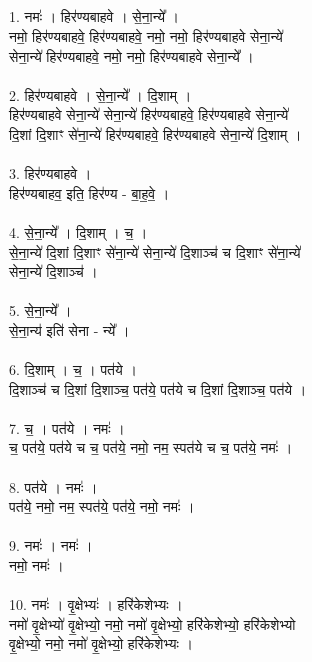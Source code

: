 \subsection{}
1. नमः॑ । हिर॑ण्यबाहवे । से॒ना॒न्ये᳚ ।\\
नमो॒ हिर॑ण्यबाहवे॒ हिर॑ण्यबाहवे॒ नमो॒ नमो॒ हिर॑ण्यबाहवे सेना॒न्ये॑\\
सेना॒न्ये॑ हिर॑ण्यबाहवे॒ नमो॒ नमो॒ हिर॑ण्यबाहवे सेना॒न्ये᳚ ।\\
\\
2. हिर॑ण्यबाहवे । से॒ना॒न्ये᳚ । दि॒शाम् ।\\
हिर॑ण्यबाहवे सेना॒न्ये॑ सेना॒न्ये॑ हिर॑ण्यबाहवे॒ हिर॑ण्यबाहवे सेना॒न्ये॑\\
दि॒शां दि॒शाꣳ से॑ना॒न्ये॑ हिर॑ण्यबाहवे॒ हिर॑ण्यबाहवे सेना॒न्ये॑ दि॒शाम् ।\\
\\
3. हिर॑ण्यबाहवे ।\\
हिर॑ण्यबाहव॒ इति॒ हिर॑ण्य - बा॒ह॒वे॒ ।\\
\\
4. से॒ना॒न्ये᳚ । दि॒शाम् । च॒ ।\\
से॒ना॒न्ये॑ दि॒शां दि॒शाꣳ से॑ना॒न्ये॑ सेना॒न्ये॑ दि॒शाञ्च॑ च दि॒शाꣳ से॑ना॒न्ये॑\\
सेना॒न्ये॑ दि॒शाञ्च॑ ।\\
\\
5. से॒ना॒न्ये᳚ ।\\
से॒ना॒न्य॑ इति॑ सेना - न्ये᳚ ।\\
\\
6. दि॒शाम् । च॒ । पत॑ये ।\\
दि॒शाञ्च॑ च दि॒शां दि॒शाञ्च॒ पत॑ये॒ पत॑ये च दि॒शां दि॒शाञ्च॒ पत॑ये ।\\
\\
7. च॒ । पत॑ये । नमः॑ ।\\
च॒ पत॑ये॒ पत॑ये च च॒ पत॑ये॒ नमो॒ नम॒ स्पत॑ये च च॒ पत॑ये॒ नमः॑ ।\\
\\
8. पत॑ये । नमः॑ ।\\
पत॑ये॒ नमो॒ नम॒ स्पत॑ये॒ पत॑ये॒ नमो॒ नमः॑ ।\\
\\
9. नमः॑ । नमः॑ ।\\
नमो॒ नमः॑ ।\\
\\
10. नमः॑ । वृ॒क्षेभ्यः॑ । हरि॑केशेभ्यः ।\\
नमो॑ वृ॒क्षेभ्यो॑ वृ॒क्षेभ्यो॒ नमो॒ नमो॑ वृ॒क्षेभ्यो॒ हरि॑केशेभ्यो॒ हरि॑केशेभ्यो\\
वृ॒क्षेभ्यो॒ नमो॒ नमो॑ वृ॒क्षेभ्यो॒ हरि॑केशेभ्यः ।\\
